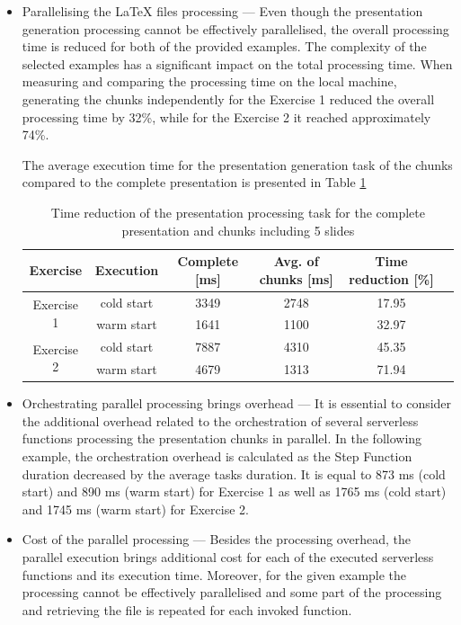 \begin{itemize}
    \item Parallelising the LaTeX files processing --- Even though the presentation generation processing cannot be effectively parallelised, the overall processing time is reduced for both of the provided examples.
   The complexity of the selected examples has a significant impact on the total processing time.
   When measuring and comparing the processing time on the local machine, generating the chunks independently for the Exercise 1 reduced the overall processing time by 32\%, while for the Exercise 2 it reached approximately 74\%.
  
   The average execution time for the presentation generation task of the chunks compared to the complete presentation is presented in Table \ref{table:overhead-of-the-presentation-processing-task-for-the-whole-presentation-and-chunks-including-5-slides}

    \begin{table}[h]
        \centering
        \begin{tabular}{ |c|c|c|c|c|c| } 
        \hline
        Exercise & Execution & Complete [ms] & Avg. of chunks [ms] & Time reduction [\%] \\
        \hline
        \multirow{2}{*}{Exercise 1} & cold start & 3349 & 2748 & 17.95 \\
        & warm start & 1641 & 1100 & 32.97 \\
        \hline
        \multirow{2}{*}{Exercise 2} & cold start & 7887 & 4310 & 45.35 \\
        & warm start & 4679 & 1313 & 71.94 \\
        \hline
        \end{tabular}
        \caption{Time reduction of the presentation processing task for the complete presentation and chunks including 5 slides}
        \label{table:overhead-of-the-presentation-processing-task-for-the-whole-presentation-and-chunks-including-5-slides}
    \end{table}

   \item Orchestrating parallel processing brings overhead --- It is essential to consider the additional overhead related to the orchestration of several serverless functions processing the presentation chunks in parallel. In the following example, the orchestration overhead is calculated as the Step Function duration decreased by the average tasks duration. It is equal to 873 ms (cold start) and 890 ms (warm start) for Exercise 1 as well as 1765 ms (cold start) and 1745 ms (warm start) for Exercise 2.
   \item Cost of the parallel processing --- Besides the processing overhead, the parallel execution brings additional cost for each of the executed serverless functions and its execution time. Moreover, for the given example the processing cannot be effectively parallelised and some part of the processing and retrieving the file is repeated for each invoked function.
\end{itemize}

